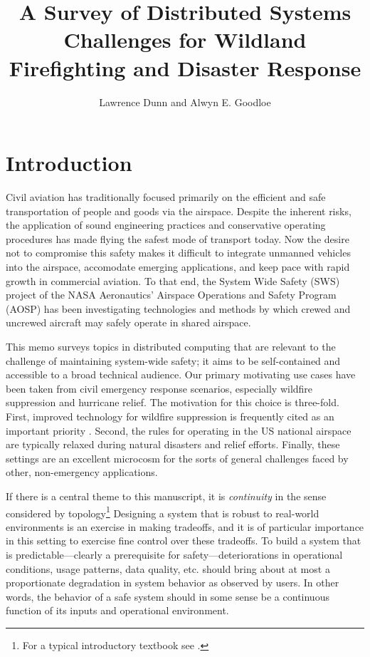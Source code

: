 \documentclass[]             %
{NASA}                       %
\title{A Survey of Distributed Systems Challenges for Wildland
Firefighting and Disaster Response}
\author{Lawrence Dunn and Alwyn E. Goodloe}
\theoremstyle{definition}
\begin{document}
\newpage
\setcounter{tocdepth}{2}
\tableofcontents
\newpage

\section{Introduction}\label{introduction}

Civil aviation has traditionally focused primarily on the efficient and
safe transportation of people and goods via the airspace. Despite the
inherent risks, the application of sound engineering practices and
conservative operating procedures has made flying the safest mode of
transport today. Now the desire not to compromise this safety makes it
difficult to integrate unmanned vehicles into the airspace, accomodate
emerging applications, and keep pace with rapid growth in commercial
aviation. To that end, the System Wide Safety (SWS) project of the NASA
Aeronautics' Airspace Operations and Safety Program (AOSP) has been
investigating technologies and methods by which crewed and uncrewed
aircraft may safely operate in shared airspace.

This memo surveys topics in distributed computing that are relevant to
the \mbox{challenge} of maintaining system-wide safety; it aims to be
self-contained and accessible to a broad technical audience. Our
primary motivating use cases have been taken from civil emergency
response scenarios, especially wildfire suppression and hurricane
relief. The motivation for this choice is three-fold. First, improved
technology for wildfire suppression is frequently cited as an
important priority \cite{pcast2023}.  Second, the rules for operating
in the US national airspace are typically relaxed during natural
disasters and relief efforts. Finally, these settings are an excellent
microcosm for the sorts of general challenges faced by other,
non-emergency applications.

If there is a central theme to this manuscript, it is
\emph{continuity} in the sense considered by topology\footnote{For a
typical introductory textbook see \cite{mendelson2012introduction}.}
Designing a system that is robust to real-world environments is an
exercise in making tradeoffs, and it is of particular importance in
this setting to exercise fine control over these tradeoffs. To build a
system that is predictable---clearly a prerequisite for
safety---deteriorations in operational conditions, usage patterns,
data quality, etc. should bring about at most a proportionate
degradation in system behavior as observed by users. In other words,
the behavior of a safe system should in some sense be a continuous
function of its inputs and operational environment.
\end{document}
